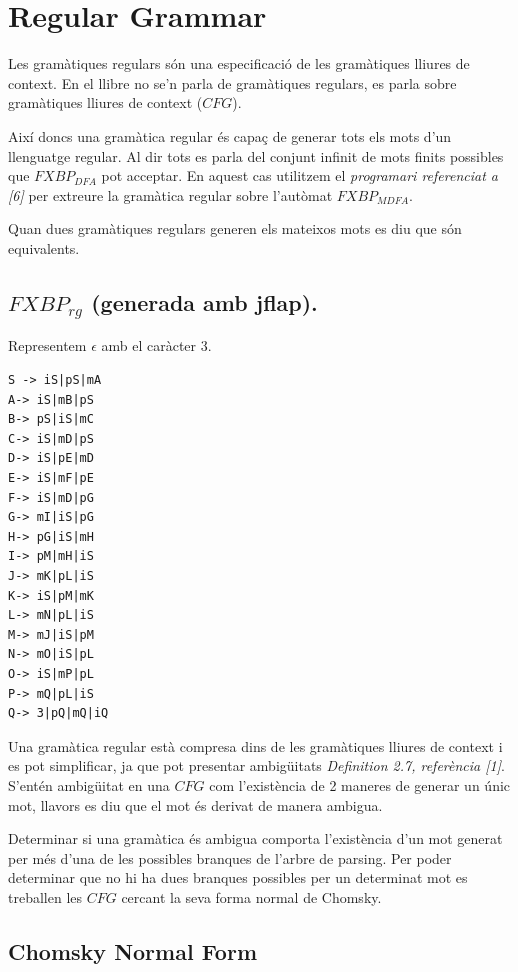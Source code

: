 \documentclass[12pt,a4paper]{report}
\def \dfa{$FXBP_{DFA} $}
\def \mfa{$FXBP_{MDFA} $}
\def \rg{$FXBP_{rg} $}
\def \cfg{$CFG$}
\begin{document}
\section{Regular Grammar}

Les gramàtiques regulars són una especificació de les gramàtiques lliures de context. En el llibre no se’n parla de gramàtiques regulars, es parla sobre gramàtiques lliures de context (\cfg{}).

Així doncs una gramàtica regular és capaç de generar tots els mots d’un llenguatge regular. Al dir tots es parla del conjunt infinit de mots finits possibles que \dfa{} pot acceptar. En aquest cas utilitzem el \textit{programari referenciat a [6]} per extreure la gramàtica regular sobre l’autòmat \mfa{}.

\begin{center}
Quan dues gramàtiques regulars generen els mateixos mots es diu que són equivalents.
\end{center}

\subsection{\rg{} (generada amb jflap).}

Representem $\epsilon$ amb el caràcter 3.

\begin{lstlisting}
S -> iS|pS|mA
A-> iS|mB|pS
B-> pS|iS|mC
C-> iS|mD|pS
D-> iS|pE|mD
E-> iS|mF|pE
F-> iS|mD|pG
G-> mI|iS|pG
H-> pG|iS|mH
I-> pM|mH|iS
J-> mK|pL|iS
K-> iS|pM|mK
L-> mN|pL|iS
M-> mJ|iS|pM
N-> mO|iS|pL
O-> iS|mP|pL
P-> mQ|pL|iS
Q-> 3|pQ|mQ|iQ
\end{lstlisting}

Una gramàtica regular està compresa dins de les gramàtiques lliures de context i es pot simplificar, ja que pot presentar ambigüitats \textit{Definition 2.7, referència [1]}. S’entén ambigüitat en una $CFG$ com l’existència de 2 maneres de generar un únic mot, llavors es diu que el mot és derivat de manera ambigua.

Determinar si una gramàtica és ambigua comporta l’existència d’un mot generat per més d’una de les possibles branques de l’arbre de parsing. Per poder determinar que no hi ha dues branques possibles per un determinat mot es treballen les $CFG$ cercant la seva forma normal de Chomsky.

\subsection{Chomsky Normal Form}
\end{document}
